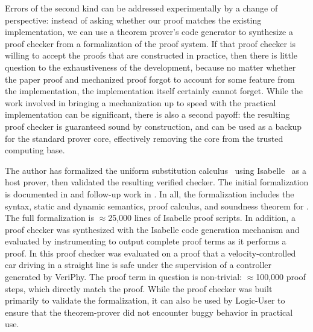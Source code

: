 \documentclass[12pt]{cmuthesis}
\theoremstyle{definition}
\theoremstyle{remark}
\newcommand{\VeriPhy}{VeriPhy\xspace}
\begin{document}
Errors of the second kind can be addressed experimentally by a change of perspective: instead of asking whether our proof matches the existing implementation, we can use a theorem prover's code generator to synthesize a proof checker from a formalization of the proof system.
If that proof checker is willing to accept the \dL proofs that are constructed in practice, then there is little question to the exhaustiveness of the development, because no matter whether the paper proof and mechanized proof forgot to account for some feature from the implementation, the implementation itself certainly cannot forget.
While the work involved in bringing a mechanization up to speed with the practical implementation can be significant, there is also a second payoff: the resulting proof checker is guaranteed sound by construction, and can be used as a backup for the standard \KeYmaeraX prover core, effectively removing the core from the trusted computing base.

The author has formalized the \dL uniform substitution calculus~\cite{DBLP:journals/jar/Platzer17} using Isabelle~\cite{DBLP:books/sp/NipkowPW02} as a host prover, then validated the resulting verified checker.
The initial formalization is documented in \cite{DBLP:conf/cpp/BohrerRVVP17} and follow-up work in \cite{DBLP:conf/pldi/BohrerTMMP18}.
In all, the formalization includes the syntax, static and dynamic semantics, proof calculus, and soundness theorem for \dL.
The full formalization is $\approx$25,000 lines of Isabelle proof scripts.
In addition, a proof checker was synthesized with the Isabelle code generation mechanism and evaluated by instrumenting \KeYmaeraX to output complete proof terms as it performs a proof.
In \cite{DBLP:conf/pldi/BohrerTMMP18} this proof checker was evaluated on a proof that a velocity-controlled car driving in a straight line is safe under the supervision of a controller generated by \VeriPhy.
The proof term in question is non-trivial: $\approx$100,000 proof steps, which directly match the \KeYmaeraX proof.
While the proof checker was built primarily to validate the \dL formalization, it can also be used by Logic-User to ensure that the theorem-prover did not encounter buggy behavior in practical use.
\end{document}
